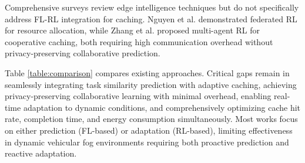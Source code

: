Comprehensive surveys \cite{zhou2019edge} review edge intelligence techniques but do not specifically address FL-RL integration for caching. Nguyen et al. \cite{nguyen2021federated} demonstrated federated RL for resource allocation, while Zhang et al. \cite{zhang2022collaborative} proposed multi-agent RL for cooperative caching, both requiring high communication overhead without privacy-preserving collaborative prediction.

Table \ref{table:comparison} compares existing approaches. Critical gaps remain in seamlessly integrating task similarity prediction with adaptive caching, achieving privacy-preserving collaborative learning with minimal overhead, enabling real-time adaptation to dynamic conditions, and comprehensively optimizing cache hit rate, completion time, and energy consumption simultaneously. Most works focus on either prediction (FL-based) or adaptation (RL-based), limiting effectiveness in dynamic vehicular fog environments requiring both proactive prediction and reactive adaptation.

